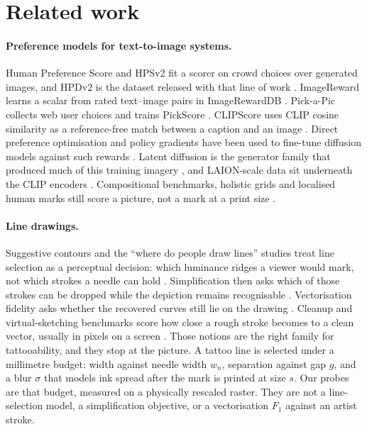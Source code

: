\section{Related work}
\label{sec:related}

\paragraph{Preference models for text-to-image systems.}
Human Preference Score and HPSv2 fit a scorer on crowd choices over generated images, and HPDv2 is the dataset released with that line of work \citep{wu2023hps,wu2023hpsv2}.
ImageReward learns a scalar from rated text--image pairs in ImageRewardDB \citep{xu2023imagereward}.
Pick-a-Pic collects web user choices and trains PickScore \citep{kirstain2023pickapic}.
CLIPScore uses CLIP cosine similarity as a reference-free match between a caption and an image \citep{hessel2021clipscore,radford2021clip}.
Direct preference optimisation and policy gradients have been used to fine-tune diffusion models against such rewards \citep{wallace2024diffusiondpo,fan2023dpok}.
Latent diffusion is the generator family that produced much of this training imagery \citep{rombach2022ldm}, and LAION-scale data sit underneath the CLIP encoders \citep{schuhmann2022laion}.
Compositional benchmarks, holistic grids and localised human marks still score a picture, not a mark at a print size \citep{huang2023t2icompbench,ghosh2023geneval,lee2023heim,liang2024richhf}.

\paragraph{Line drawings.}
Suggestive contours and the ``where do people draw lines'' studies treat line selection as a perceptual decision: which luminance ridges a viewer would mark, not which strokes a needle can hold \citep{decarlo2003suggestive,cole2008where}.
Simplification then asks which of those strokes can be dropped while the depiction remains recognisable \citep{simoserra2016simplify}.
Vectorisation fidelity asks whether the recovered curves still lie on the drawing \citep{favreau2016fidelity}.
Cleanup and virtual-sketching benchmarks score how close a rough stroke becomes to a clean vector, usually in pixels on a screen \citep{yan2020sketchcleanup,mo2021virtualsketching}.
Those notions are the right family for tattooability, and they stop at the picture.
A tattoo line is selected under a millimetre budget: width against needle width $w_n$, separation against gap $g$, and a blur $\sigma$ that models ink spread after the mark is printed at size $s$.
Our probes are that budget, measured on a physically rescaled raster.
They are not a line-selection model, a simplification objective, or a vectorisation $F_1$ against an artist stroke.

